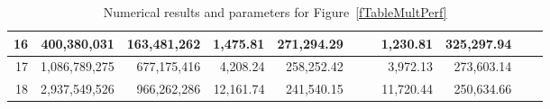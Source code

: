 \documentclass[conference]{IEEEtran}
\begin{document}
\begin{table*}[tb]
\begin{tabular}{|r|r|r|r|r|r|r|r|r|r|r|}
\hline                                                                                                                    
16 & 400,380,031 & 163,481,262 & 1,475.81 & 271,294.29 &  &  & 1,230.81 & 325,297.94 &  &  \\                             
\hline                                                                                                                    
17 & 1,086,789,275 & 677,175,416 & 4,208.24 & 258,252.42 &  &  & 3,972.13 & 273,603.14 &  &  \\                           
\hline                                                                                                                    
18 & 2,937,549,526 & 966,262,286 & 12,161.74 & 241,540.15 &  &  & 11,720.44 & 250,634.66 &  &  \\                       
\hline                                                                                                                    
\end{tabular}
\caption{Numerical results and parameters for Figure~\ref{fTableMultPerf}}
\label{tResultsParams}
\end{table*}






%
%
\end{document}
